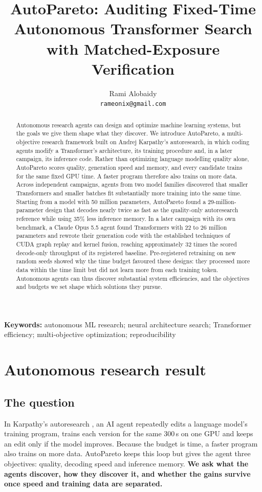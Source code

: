 \documentclass{article}
\title{AutoPareto: Auditing Fixed-Time Autonomous Transformer Search\\with Matched-Exposure Verification}
\author{Rami Alobaidy\\ \texttt{rameonix@gmail.com}}
\begin{document}
\maketitle
\begin{abstract}
Autonomous research agents can design and optimize machine learning systems, but the goals we give them shape what they discover. We introduce AutoPareto, a multi-objective research framework built on Andrej Karpathy's autoresearch, in which coding agents modify a Transformer's architecture, its training procedure and, in a later campaign, its inference code. Rather than optimizing language modelling quality alone, AutoPareto scores quality, generation speed and memory, and every candidate trains for the same fixed GPU time. A faster program therefore also trains on more data. Across independent campaigns, agents from two model families discovered that smaller Transformers and smaller batches fit substantially more training into the same time. Starting from a model with 50 million parameters, AutoPareto found a 29-million-parameter design that decodes nearly twice as fast as the quality-only autoresearch reference while using 35\% less inference memory. In a later campaign with its own benchmark, a Claude Opus 5.5 agent found Transformers with 22 to 26 million parameters and rewrote their generation code with the established techniques of CUDA graph replay and kernel fusion, reaching approximately 32 times the scored decode-only throughput of its registered baseline. Pre-registered retraining on new random seeds showed why the time budget favoured these designs: they processed more data within the time limit but did not learn more from each training token. Autonomous agents can thus discover substantial system efficiencies, and the objectives and budgets we set shape which solutions they pursue.
\end{abstract}

\noindent\textbf{Keywords:} autonomous ML research; neural architecture search; Transformer efficiency; multi-objective optimization; reproducibility

\section{Autonomous research result}\label{partone}

\subsection{The question}\label{sec:question}
 In Karpathy's autoresearch \citep{autoresearch}, an AI agent repeatedly edits a language model's training program, trains each version for the same 300\,s on one GPU and keeps an edit only if the model improves. Because the budget is time, a faster program also trains on more data. AutoPareto keeps this loop but gives the agent three objectives: quality, decoding speed and inference memory. \textbf{We ask what the agents discover, how they discover it, and whether the gains survive once speed and training data are separated.}
\end{document}
